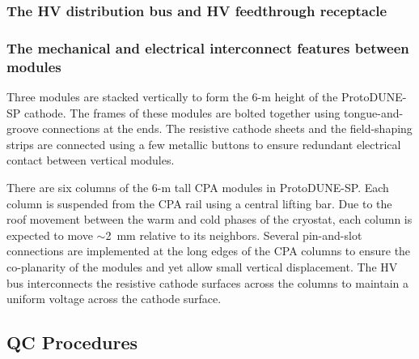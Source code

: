\subsubsection{The HV distribution bus and HV feedthrough receptacle }


\subsubsection{The mechanical and electrical interconnect features between modules}

Three modules are stacked vertically to form the 6-m height of the ProtoDUNE-SP  cathode.  The frames of these modules are bolted together using tongue-and-groove connections at the ends. The resistive cathode sheets and the field-shaping strips are connected using a few metallic buttons to ensure redundant electrical contact between vertical modules.

There are six columns of the 6-m tall CPA modules in  ProtoDUNE-SP.  Each column is suspended from the CPA rail using a central lifting bar.  Due to the  roof movement between the warm and cold phases of the cryostat, each column is expected to move $\sim$2~mm relative to its neighbors.  Several pin-and-slot connections are implemented at the long edges of the CPA columns to ensure the co-planarity of the modules and yet allow small vertical displacement.  The HV bus interconnects the resistive cathode surfaces across the columns to maintain a uniform voltage across the cathode surface.

\subsection{QC Procedures}

